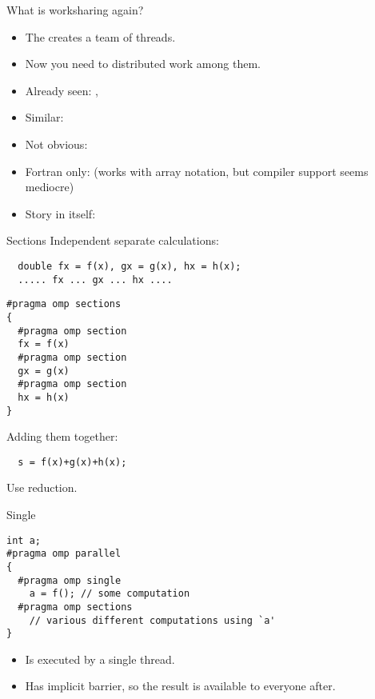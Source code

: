 
\begin{numberedframe}{What is worksharing again?}
  \begin{itemize}
  \item The  creates a team of threads.
  \item Now you need to distributed work among them.
  \item Already seen: , 
  \item Similar: 
  \item Not obvious: 
  \item Fortran only:  (works with array notation, but
    compiler support seems mediocre)
  \item Story in itself: 
  \end{itemize}
\end{numberedframe}

\begin{numberedframe}{Sections}
\small
Independent separate calculations:
\begin{verbatim}
  double fx = f(x), gx = g(x), hx = h(x);
  ..... fx ... gx ... hx ....
\end{verbatim}
\begin{verbatim}
#pragma omp sections
{
  #pragma omp section
  fx = f(x)
  #pragma omp section
  gx = g(x)
  #pragma omp section
  hx = h(x)
}
\end{verbatim}
Adding them together:
\begin{verbatim}
  s = f(x)+g(x)+h(x);
\end{verbatim}
Use reduction.
\end{numberedframe}

\begin{numberedframe}{Single}
\begin{verbatim}
int a;
#pragma omp parallel
{
  #pragma omp single
    a = f(); // some computation
  #pragma omp sections
    // various different computations using `a'
}
\end{verbatim}
  \begin{itemize}
  \item Is executed by a single thread.
  \item Has implicit barrier, so the result is available to everyone
    after.
  \end{itemize}
\end{numberedframe}

